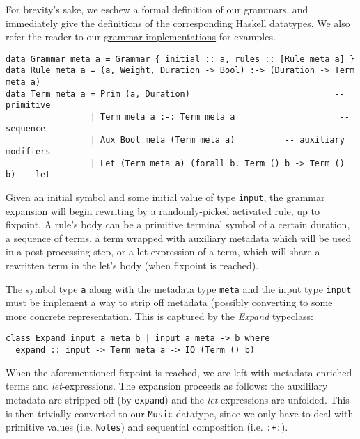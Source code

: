 \documentclass[11pt,a4paper]{article}
\newcommand{\icode}[1]{\texttt{#1}}
\begin{document}
For brevity's sake, we eschew a formal definition of our grammars, and immediately give the definitions of the corresponding Haskell datatypes. We also refer the reader to our \href{https://github.com/omelkonian/AlgoRhythm/blob/master/AlgoRhythm/src/Grammar}{grammar implementations} for examples.
\begin{verbatim}
data Grammar meta a = Grammar { initial :: a, rules :: [Rule meta a] }
data Rule meta a = (a, Weight, Duration -> Bool) :-> (Duration -> Term meta a)
data Term meta a = Prim (a, Duration)                             -- primitive
                 | Term meta a :-: Term meta a                     -- sequence
                 | Aux Bool meta (Term meta a)          -- auxiliary modifiers
                 | Let (Term meta a) (forall b. Term () b -> Term () b) -- let
\end{verbatim}

Given an initial symbol and some initial value of type \icode{input}, the grammar expansion will begin rewriting by a randomly-picked activated rule, up to fixpoint. A rule's body can be a primitive terminal symbol of a certain duration, a sequence of terms, a term wrapped with auxiliary metadata which will be used in a post-processing step, or a let-expression of a term, which will share a rewritten term in the let's body (when fixpoint is reached).

The symbol type \icode{a} along with the metadata type \icode{meta} and the input type \icode{input} must be implement a way to strip off metadata (possibly converting to some more concrete representation. This is captured by the \textit{Expand} typeclass:
\begin{center}\begin{minipage}{0.6\textwidth}\begin{verbatim}
class Expand input a meta b | input a meta -> b where
  expand :: input -> Term meta a -> IO (Term () b)
\end{verbatim}
\end{minipage}
\end{center}

When the aforementioned fixpoint is reached, we are left with metadata-enriched terms and \textit{let}-expressions. The expansion proceeds as follows: the auxililary metadata are stripped-off (by \icode{expand}) and the \textit{let}-expressions are unfolded. This is then trivially converted to our \icode{Music} datatype, since we only have to deal with primitive values (i.e. \icode{Notes}) and sequential composition (i.e. \icode{:+:}).
\end{document}
